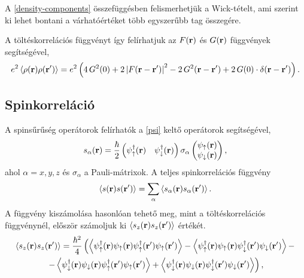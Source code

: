 \documentclass[a4paper,12pt,titlepage]{article}
\newcommand{\RR}{{\vb{r}}}
\begin{document}
A \eqref{density-components} összefüggésben felismerhetjük a Wick-tételt, ami szerint ki lehet bontani a várhatóértéket több egyszerűbb tag összegére.

A töltéskorrelációs függvényt így felírhatjuk az $F(\RR)$ és $G(\RR)$ függvények segítségével,
\begin{equation}
	e^2 \left< \rho(\RR) \rho(\RR^\prime) \right> = e^2 \left( 4 \, G^2(0) + 2 \left| F(\RR - \RR^\prime) \right|^2 - 2 \, G^2(\RR - \RR^\prime) + 2 \, G(0) \cdot \delta(\RR - \RR^\prime) \right).
\end{equation}


\subsection{Spinkorreláció}

A spinsűrűség operátorok felírhatók a \eqref{psi} keltő operátorok segítségével,
\begin{equation}
	s_\alpha(\RR) = \frac{\hbar}{2} \begin{pmatrix} \psi_\uparrow^\dagger(\RR) & \psi_\downarrow^\dagger(\RR) \end{pmatrix} \sigma_\alpha \begin{pmatrix} \psi_\uparrow(\RR) \\ \psi_\downarrow(\RR) \end{pmatrix},
\end{equation}
ahol $\alpha = x, y, z$ és $\sigma_\alpha$ a Pauli-mátrixok.  A teljes spinkorrelációs függvény
\begin{equation}
	\left< s(\RR) s(\RR^\prime) \right> = \sum_\alpha \left< s_\alpha(\RR) s_\alpha(\RR^\prime) \right>.
\end{equation}
A függvény kiszámolása hasonlóan tehető meg, mint a töltéskorrelációs függvénynél, először számoljuk ki $\left< s_z(\RR) s_z(\RR^\prime) \right>$ értékét.
\begin{multline}
	\left< s_z(\RR) s_z(\RR^\prime) \right> = \frac{\hbar^2}{4} \left( \left< \psi_\uparrow^\dagger(\RR) \psi_\uparrow(\RR) \psi_\uparrow^\dagger(\RR^\prime) \psi_\uparrow(\RR^\prime) \right> - \left< \psi_\uparrow^\dagger(\RR) \psi_\uparrow(\RR) \psi_\downarrow^\dagger(\RR^\prime) \psi_\downarrow(\RR^\prime) \right> -
	\right. \\ \left. -
	\left< \psi_\downarrow^\dagger(\RR) \psi_\downarrow(\RR) \psi_\uparrow^\dagger(\RR^\prime) \psi_\uparrow(\RR^\prime) \right> + \left< \psi_\downarrow^\dagger(\RR) \psi_\downarrow(\RR) \psi_\downarrow^\dagger(\RR^\prime) \psi_\downarrow(\RR^\prime) \right> \right),
\end{multline}
\end{document}
